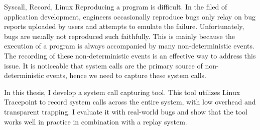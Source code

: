 
\begin{英文摘要}{Syscall, Record, Linux}
    Reproducing a program is difficult. In the filed of application development,  engineers occasionally reproduce bugs only relay on bug reports uploaded by users and attempts to emulate the failure. Unfortunately, bugs are usually not reproduced such faithfully. This is mainly because the execution of a program is always accompanied by many non-deterministic events. The recording of these non-deterministic events is an effective way to address this issue. It is noticeable that system calls are the primary source of non-deterministic events, hence we need to capture these system calls.
    
    In this thesis, I develop a system call capturing tool. This tool utilizes Linux Tracepoint to record system calls across the entire system, with low overhead and transparent trapping. I evaluate it with real-world bugs and show that the tool works well in practice in combination with a replay system.
\end{英文摘要}
